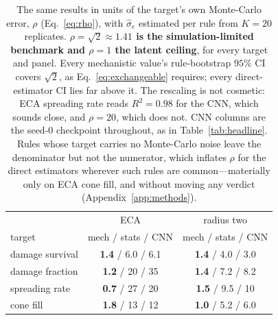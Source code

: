 \documentclass[aip,cha,amsmath,amssymb,reprint,floatfix]{revtex4-2}
\newcommand{\rtwo}{$R^2$}
\begin{document}
\begin{table}[t]
\centering
\begin{ruledtabular}
\begin{tabular}{lcc}
 & ECA & radius two \\
target & mech / stats / CNN & mech / stats / CNN \\
\colrule
damage survival & \textbf{1.4} / 6.0 / 6.1 & \textbf{1.4} / 4.0 / 3.0 \\
damage fraction & \textbf{1.2} / 20 / 35 & \textbf{1.4} / 7.2 / 8.2 \\
spreading rate & \textbf{0.7} / 27 / 20 & \textbf{1.5} / 9.5 / 10 \\
cone fill & \textbf{1.8} / 13 / 12 & \textbf{1.0} / 5.2 / 6.0 \\
\end{tabular}
\end{ruledtabular}
\caption{The same results in units of the target's own Monte-Carlo error,
$\rho$ (Eq.~\eqref{eq:rho}), with $\hat\sigma_e$ estimated per rule from
$K=20$ replicates. \textbf{$\rho=\sqrt2\approx1.41$ is the simulation-limited
benchmark and $\rho=1$ the latent ceiling}, for every target and panel. Every
mechanistic value's rule-bootstrap $95\%$ CI covers $\sqrt2$, as
Eq.~\eqref{eq:exchangeable} requires; every direct-estimator CI lies far above
it. The rescaling is not cosmetic: ECA spreading rate reads
\rtwo{}${=}0.98$ for the CNN, which sounds close, and $\rho=20$, which does
not. CNN columns are the seed-$0$ checkpoint throughout, as in
Table~\ref{tab:headline}. Rules whose target carries no Monte-Carlo noise
leave the denominator but not the numerator, which inflates $\rho$ for the
direct estimators wherever such rules are common---materially only on ECA
cone fill, and without moving any verdict (Appendix~\ref{app:methods}).}
\label{tab:rho}
\end{table}
\end{document}
